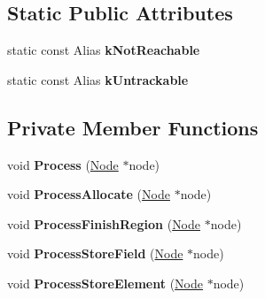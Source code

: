 \subsection*{Static Public Attributes}
\begin{DoxyCompactItemize}
\item 
static const Alias {\bfseries k\+Not\+Reachable}
\item 
static const Alias {\bfseries k\+Untrackable}
\end{DoxyCompactItemize}
\subsection*{Private Member Functions}
\begin{DoxyCompactItemize}
\item 
void {\bfseries Process} (\hyperlink{classv8_1_1internal_1_1compiler_1_1_node}{Node} $\ast$node)\hypertarget{classv8_1_1internal_1_1compiler_1_1_escape_status_analysis_aad79bf7d70eafa1e7be7dd93af0fae4e}{}\label{classv8_1_1internal_1_1compiler_1_1_escape_status_analysis_aad79bf7d70eafa1e7be7dd93af0fae4e}

\item 
void {\bfseries Process\+Allocate} (\hyperlink{classv8_1_1internal_1_1compiler_1_1_node}{Node} $\ast$node)\hypertarget{classv8_1_1internal_1_1compiler_1_1_escape_status_analysis_ae16606bc1498a6e4389399579a65bfd6}{}\label{classv8_1_1internal_1_1compiler_1_1_escape_status_analysis_ae16606bc1498a6e4389399579a65bfd6}

\item 
void {\bfseries Process\+Finish\+Region} (\hyperlink{classv8_1_1internal_1_1compiler_1_1_node}{Node} $\ast$node)\hypertarget{classv8_1_1internal_1_1compiler_1_1_escape_status_analysis_a1fb6df2a8c6e383504ac6552624b6993}{}\label{classv8_1_1internal_1_1compiler_1_1_escape_status_analysis_a1fb6df2a8c6e383504ac6552624b6993}

\item 
void {\bfseries Process\+Store\+Field} (\hyperlink{classv8_1_1internal_1_1compiler_1_1_node}{Node} $\ast$node)\hypertarget{classv8_1_1internal_1_1compiler_1_1_escape_status_analysis_a4c0148a33f663d9dcc6ccd6dc0c03e39}{}\label{classv8_1_1internal_1_1compiler_1_1_escape_status_analysis_a4c0148a33f663d9dcc6ccd6dc0c03e39}

\item 
void {\bfseries Process\+Store\+Element} (\hyperlink{classv8_1_1internal_1_1compiler_1_1_node}{Node} $\ast$node)\hypertarget{classv8_1_1internal_1_1compiler_1_1_escape_status_analysis_ae51a668b50a00299fffeff70881bdf2c}{}\label{classv8_1_1internal_1_1compiler_1_1_escape_status_analysis_ae51a668b50a00299fffeff70881bdf2c}


\end{DoxyCompactItemize}

